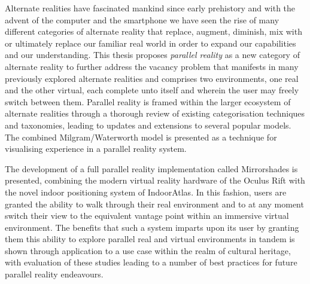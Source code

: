 Alternate realities have fascinated mankind since early prehistory and with the advent of the computer and the smartphone we have seen the rise of many different categories of alternate reality that replace, augment, diminish, mix with or ultimately replace our familiar real world in order to expand our capabilities and our understanding. This thesis proposes \textit{parallel reality} as a new category of alternate reality to further address the vacancy problem that manifests in many previously explored alternate realities and comprises two environments, one real and the other virtual, each complete unto itself and wherein the user may freely switch between them. Parallel reality is framed within the larger ecosystem of alternate realities through a thorough review of existing categorisation techniques and taxonomies, leading to updates and extensions to several popular models. The combined Milgram/Waterworth model is presented as a technique for visualising experience in a parallel reality system.

The development of a full parallel reality implementation called Mirrorshades is presented, combining the modern virtual reality hardware of the Oculus Rift with the novel indoor positioning system of IndoorAtlas. In this fashion, users are granted the ability to walk through their real environment and to at any moment switch their view to the equivalent vantage point within an immersive virtual environment. The benefits that such a system imparts upon its user by granting them this ability to explore parallel real and virtual environments in tandem is shown through application to a use case within the realm of cultural heritage, with evaluation of these studies leading to a number of best practices for future parallel reality endeavours.